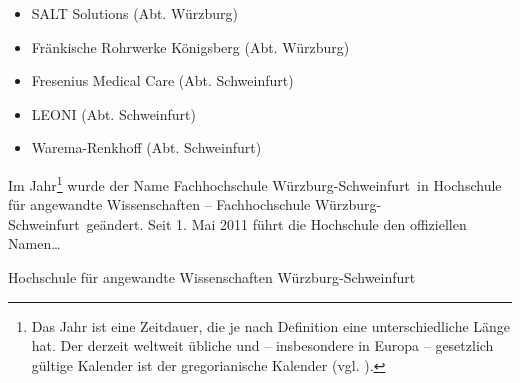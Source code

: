 \begin{itemize}
\item SALT Solutions (Abt. Würzburg)
\item Fränkische Rohrwerke Königsberg (Abt. Würzburg)
\item Fresenius Medical Care (Abt. Schweinfurt)
\item LEONI (Abt. Schweinfurt)
\item Warema-Renkhoff (Abt. Schweinfurt)
\end{itemize}

\vskip 10mm

Im Jahr\footnote{Das Jahr ist eine Zeitdauer, die je nach Definition eine unterschiedliche Länge hat. Der derzeit weltweit übliche und – insbesondere in Europa – gesetzlich gültige Kalender ist der gregorianische Kalender (vgl. \cite{Theis.2018,Vijayakumaran.2016}).} wurde der Name \glqq Fachhochschule Würzburg-Schweinfurt\grqq~in \glqq Hochschule für angewandte Wissenschaften – Fachhochschule Würzburg-Schweinfurt\grqq~geändert. Seit 1. Mai 2011 führt die Hochschule den offiziellen Namen\ldots

\begin{center}
\glqq Hochschule für angewandte Wissenschaften Würzburg-Schweinfurt\grqq
\end{center}
 
